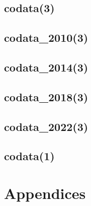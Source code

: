 \documentclass[11pt,a4paper,twoside,openright]{book}
\begin{document}
\chapter{codata(3)}


\chapter{codata\_2010(3)}


\chapter{codata\_2014(3)}


\chapter{codata\_2018(3)}


\chapter{codata\_2022(3)}


\chapter{codata(1)}

\part{Appendices}



\backmatter
\pagestyle{plain}
\nocite{*}
\printbibliography[heading=bibintoc]
\printindex
\end{document}
